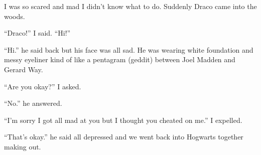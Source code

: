 I was so scared and mad I didn't know what to do. Suddenly Draco came into the woods.

\enquote{Draco!} I said. \enquote{Hi!}

\enquote{Hi.} he said back but his face was all sad. He was wearing white foundation and messy eyeliner kind of like a pentagram (geddit) between Joel Madden and Gerard Way.

\enquote{Are you okay?} I asked.

\enquote{No.} he answered.

\enquote{I'm sorry I got all mad at you but I thought you cheated on me.} I expelled.

\enquote{That's okay.} he said all depressed and we went back into Hogwarts together making out.
